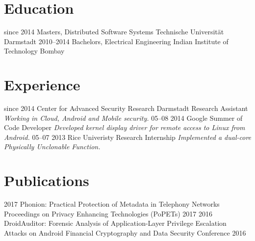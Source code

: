 \documentclass[]{friggeri-cv}
\begin{document}
\section{Education}
\begin{entrylist}
  \entry
    {since 2014}
    {Masters, {\normalfont Distributed Software Systems}}
    {Technische Universität Darmstadt}
    {}%
  \entry
    {2010–2014}
    {Bachelors, {\normalfont Electrical Engineering}}
    {Indian Institute of Technology Bombay}
    {}%
\end{entrylist}

\section{Experience}
\begin{entrylist}
  \entry
    {since 2014}
    {Center for Advanced Security Research Darmstadt}
    {Research Assistant}
    {\emph{Working in Cloud, Android and Mobile security.}}
  \entry
    {05–08 2014}
    {Google Summer of Code}
    {Developer}
    {\emph{Developed kernel display driver for remote access to Linux from Android.}}
  \entry
    {05–07 2013}
    {Rice Univeristy}
    {Research Internship}
    {\emph{Implemented a dual-core Physically Unclonable Function.}}
\end{entrylist}

\section{Publications}
\begin{entrylist}
  \entry
    {2017}
    {Phonion: Practical Protection of Metadata in Telephony Networks}
    {Proceedings on Privacy Enhancing Technologies (PoPETs) 2017}
    {}
  \entry
    {2016}
    {DroidAuditor: Forensic Analysis of Application-Layer Privilege Escalation Attacks on Android}
    {Financial Cryptography and Data Security Conference 2016}
    {}

\end{entrylist}
\end{document}
